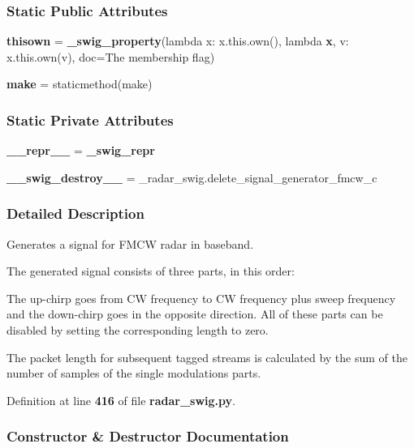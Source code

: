\subsubsection*{Static Public Attributes}
\begin{DoxyCompactItemize}
\item 
{\bf thisown} = {\bf \+\_\+swig\+\_\+property}(lambda x\+: x.\+this.\+own(), lambda {\bf x}, v\+: x.\+this.\+own(v), doc=\textquotesingle{}The membership flag\textquotesingle{})
\item 
{\bf make} = staticmethod(make)
\end{DoxyCompactItemize}
\subsubsection*{Static Private Attributes}
\begin{DoxyCompactItemize}
\item 
{\bf \+\_\+\+\_\+repr\+\_\+\+\_\+} = {\bf \+\_\+swig\+\_\+repr}
\item 
{\bf \+\_\+\+\_\+swig\+\_\+destroy\+\_\+\+\_\+} = \+\_\+radar\+\_\+swig.\+delete\+\_\+signal\+\_\+generator\+\_\+fmcw\+\_\+c
\end{DoxyCompactItemize}


\subsubsection{Detailed Description}
\begin{DoxyVerb}Generates a signal for FMCW radar in baseband.

The generated signal consists of three parts, in this order:




The up-chirp goes from CW frequency to CW frequency plus sweep frequency and the down-chirp goes in the opposite direction. All of these parts can be disabled by setting the corresponding length to zero.

The packet length for subsequent tagged streams is calculated by the sum of the number of samples of the single modulations parts.
\end{DoxyVerb}
 

Definition at line {\bf 416} of file {\bf radar\+\_\+swig.\+py}.



\subsubsection{Constructor \& Destructor Documentation}
